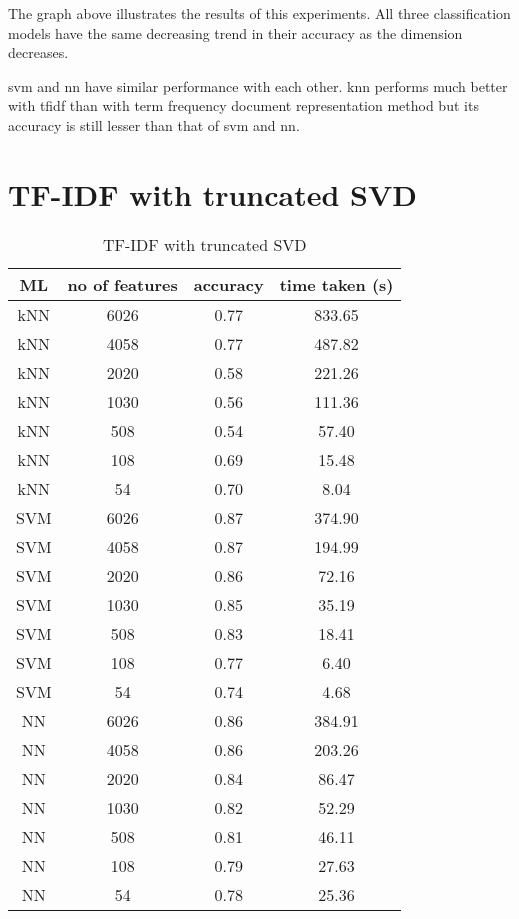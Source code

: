 The graph above illustrates the results of this experiments. All three classification models have the same decreasing trend in their accuracy as the dimension decreases. 

\Ac{svm} and \ac{nn} have similar performance with each other. \Ac{knn} performs much better with tfidf than with term frequency document representation method but its accuracy is still lesser than that of \ac{svm} and \ac{nn}.

\section{TF-IDF with truncated SVD}

\begin{table} [h]
	\centering
	\caption{TF-IDF with truncated SVD}
	\label{tbl:tfidfSvd}
	\begin{tabular}{|| c | c | c | c||}
		\hline
		ML & no of features & accuracy & time taken (s) \\ [0.5ex]
		\hline\hline
		kNN & 6026 & 0.77 & 833.65 \\
		\hline
		kNN & 4058 & 0.77 & 487.82 \\ 
		\hline
		kNN & 2020 & 0.58 & 221.26 \\ 
		\hline
		kNN & 1030 & 0.56 & 111.36 \\
		\hline
		kNN & 508 & 0.54 & 57.40 \\ 
		\hline
		kNN & 108 & 0.69 & 15.48 \\ 
		\hline
		kNN & 54 & 0.70 & 8.04 \\ 
		\hline\hline
		SVM & 6026 & 0.87 & 374.90 \\
		\hline
		SVM & 4058 & 0.87 & 194.99 \\
		\hline
		SVM & 2020 & 0.86 & 72.16 \\
		\hline
		SVM & 1030 & 0.85 & 35.19 \\
		\hline
		SVM & 508 & 0.83 & 18.41 \\
		\hline
		SVM & 108 & 0.77 & 6.40 \\
		\hline
		SVM & 54 & 0.74 & 4.68 \\
		\hline\hline
		NN & 6026 & 0.86 & 384.91 \\
		\hline
		NN & 4058 & 0.86 & 203.26 \\
		\hline
		NN & 2020 & 0.84 & 86.47 \\
		\hline
		NN & 1030 & 0.82 & 52.29 \\
		\hline
		NN & 508 & 0.81 & 46.11 \\
		\hline
		NN & 108 & 0.79 & 27.63 \\
		\hline
		NN & 54 & 0.78 & 25.36 \\
		\hline
	\end{tabular}
\end{table}

